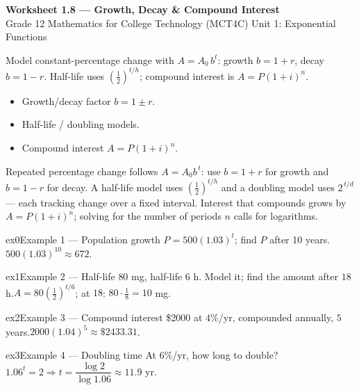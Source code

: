 \documentclass[11pt]{article}
\begin{document}
\begin{center}
{\LARGE\bfseries\color{titleblue}Worksheet 1.8 --- Growth, Decay \& Compound Interest}\\[2pt]
{\small Grade 12 Mathematics for College Technology (MCT4C) \textperiodcentered{} Unit 1: Exponential Functions}
\end{center}

\begin{ideabox}
Model constant-percentage change with $A=A_0\,b^{t}$: growth $b=1+r$, decay $b=1-r$. Half-life uses $\left(\tfrac12\right)^{t/h}$; compound interest is $A=P(1+i)^{n}$.
\begin{itemize}[leftmargin=*,itemsep=2pt]
  \item Growth/decay factor $b=1\pm r$.
  \item Half-life / doubling models.
  \item Compound interest $A=P(1+i)^{n}$.
\end{itemize}
\end{ideabox}

\begin{learnbox}
Repeated percentage change follows $A=A_0 b^{\,t}$: use $b=1+r$ for growth and $b=1-r$ for decay.
A half-life model uses $\left(\tfrac12\right)^{t/h}$ and a doubling model uses $2^{\,t/d}$ — each tracking change over a fixed interval.
Interest that compounds grows by $A=P(1+i)^n$; solving for the number of periods $n$ calls for logarithms.
\end{learnbox}


\begin{example}{ex0}{Example 1 --- Population growth}
$P=500(1.03)^{t}$; find $P$ after 10 years.\soln $500(1.03)^{10}\approx672$.
\end{example}

\begin{example}{ex1}{Example 2 --- Half-life}
$80$ mg, half-life $6$ h. Model it; find the amount after $18$ h.\soln $A=80\left(\tfrac12\right)^{t/6}$; at $18$: $80\cdot\tfrac18=10$ mg.
\end{example}

\begin{example}{ex2}{Example 3 --- Compound interest}
\$2000 at $4\%$/yr, compounded annually, $5$ years.\soln $2000(1.04)^{5}\approx\$2433.31$.
\end{example}

\begin{example}{ex3}{Example 4 --- Doubling time}
At $6\%$/yr, how long to double?\soln $1.06^t=2\Rightarrow t=\dfrac{\log 2}{\log 1.06}\approx11.9$ yr.
\end{example}
\end{document}
